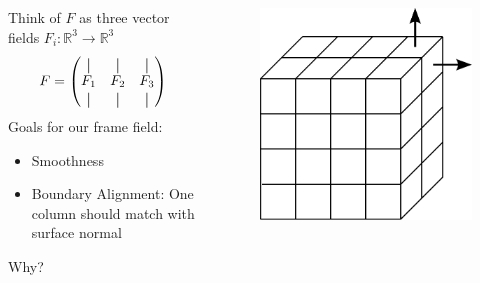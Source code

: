 \documentclass[
	11pt, %
	aspectratio=169, %
]{beamer}
\newcommand*{\vertbar}{\rule[-1ex]{0.5pt}{2.5ex}}
\begin{document}
\begin{frame}
\begin{columns}[c]
		\begin{column}{0.6\textwidth} %
			Think of $F$ as three vector fields $F_i : \mathbb{R}^3 \to \mathbb{R}^3$
			$$F=\begin{pmatrix}
				\vertbar & \vertbar & \vertbar \\
				F_1 & F_2 & F_3 \\
				\vertbar & \vertbar & \vertbar
			\end{pmatrix}$$
			Goals for our frame field:
			\begin{itemize}
				\item Smoothness
				\item Boundary Alignment: One column should match with surface normal
			\end{itemize}
			Why?
		\end{column}
		\begin{column}{0.35\textwidth} %
			\begin{figure}
				\includegraphics[width=\linewidth]{cube.pdf}
			\end{figure}
		\end{column}
	\end{columns}
\end{frame}
\end{document}
